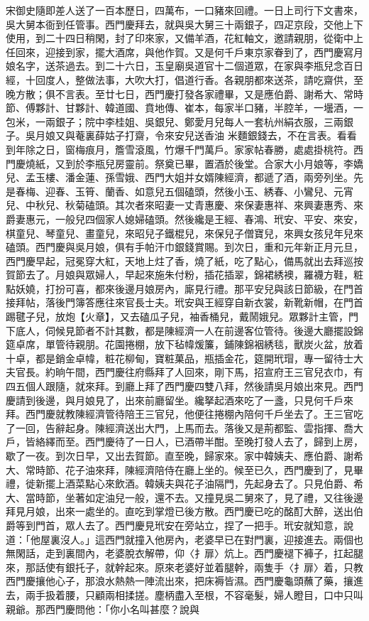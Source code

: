 \begin{showcontents}{}
宋御史隨即差人送了一百本歷日，四萬布，一口豬來回禮。一日上司行下文書來，吳大舅本衙到任管事。西門慶拜去，就與吳大舅三十兩銀子，四疋京段，交他上下使用，到二十四日稍閑，封了印來家，又備羊酒，花紅軸文，邀請親朋，從衛中上任回來，迎接到家，擺大酒席，與他作賀。又是何千戶東京家眷到了，西門慶寫月娘名字，送茶過去。到二十六日，玉皇廟吳道官十二個道眾，在家與李瓶兒念百日經，十回度人，整做法事，大吹大打，倡道行香。各親朋都來送茶，請吃齋供，至晚方散；俱不言表。至廿七日，西門慶打發各家禮畢，又是應伯爵、謝希大、常時節、傅夥計、甘夥計、韓道國、賁地傳、崔本，每家半口豬，半腔羊，一壜酒，一包米，一兩銀子；院中李桂姐、吳銀兒、鄭愛月兒每人一套杭州絹衣服，三兩銀子。吳月娘又與菴裏薛姑子打齋，令來安兒送香油 米麵銀錢去，不在言表。看看到年除之日，窗梅痕月，簷雪滾風，竹爆千門萬戶。家家帖春勝，處處掛桃符。西門慶燒紙，又到於李瓶兒房靈前。祭奠已畢，置酒於後堂。合家大小月娘等，李嬌兒、孟玉樓、潘金蓮、孫雪娥、西門大姐并女婿陳經濟，都遞了酒，兩旁列坐。先是春梅、迎春、玉筲、蘭香、如意兒五個磕頭，然後小玉、綉春、小鸞兒、元宵兒、中秋兒、秋菊磕頭。其次者來昭妻一丈青惠慶、來保妻惠祥、來興妻惠秀、來爵妻惠元，一般兒四個家人媳婦磕頭。然後纔是王經、春鴻、玳安、平安、來安，棋童兒、琴童兒、畫童兒，來昭兒子鐵棍兒，來保兒子僧寶兒，來興女孩兒年兒來磕頭。西門慶與吳月娘，俱有手帕汗巾銀錢賞賜。到次日，重和元年新正月元旦，西門慶早起，冠冕穿大紅，天地上炷了香，燒了紙，吃了點心，備馬就出去拜巡按賀節去了。月娘與眾婦人，早起來施朱付粉，插花插翠，錦裙綉襖，羅襪方鞋，粧點妖嬈，打扮可喜，都來後邊月娘房內，廝見行禮。那平安兒與該日節級，在門首接拜帖，落後門簿答應往來官長士夫。玳安與王經穿自新衣裳，新靴新帽，在門首踢毽子兒，放炮【火章】，又去磕瓜子兒，袖香桶兒，戴鬧娥兒。眾夥計主管，門下底人，伺候見節者不計其數，都是陳經濟一人在前邊客位管待。後邊大廳擺設錦筵卓席，單管待親朋。花園捲棚，放下毡幃煖簾，鋪陳錦裀綉毯，獸炭火盆，放着十卓，都是銷金卓幃，粧花柳甸，寶粧菓品，瓶插金花，筵開玳瑁，專一留待士大夫官長。約晌午間，西門慶往府縣拜了人回來，剛下馬，招宣府王三官兒衣巾，有四五個人跟隨，就來拜。到廳上拜了西門慶四雙八拜，然後請吳月娘出來見。西門慶請到後邊，與月娘見了，出來前廳留坐。纔拏起酒來吃了一盞，只見何千戶來拜。西門慶就教陳經濟管待陪王三官兒，他便往捲棚內陪何千戶坐去了。王三官吃了一回，告辭起身。陳經濟送出大門，上馬而去。落後又是荊都監、雲指揮、喬大戶，皆絡繹而至。西門慶待了一日人，已酒帶半酣。至晚打發人去了，歸到上房，歇了一夜。到次日早，又出去賀節。直至晚，歸家來。家中韓姨夫、應伯爵、謝希大、常時節、花子油來拜，陳經濟陪侍在廳上坐的。候至已久，西門慶到了，見畢禮，徙新擺上酒菜點心來飲酒。韓姨夫與花子油隔門，先起身去了。只見伯爵、希大、當時節，坐著如定油兒一般，還不去。又撞見吳二舅來了，見了禮，又往後邊拜見月娘，出來一處坐的。直吃到掌燈已後方散。西門慶已吃的酩酊大醉，送出伯爵等到門首，眾人去了。西門慶見玳安在旁站立，捏了一把手。玳安就知意，說道：「他屋裏沒人。」這西門就撞入他房內，老婆早已在對門裏，迎接進去。兩個也無閑話，走到裏間內，老婆脫衣解帶，仰〈扌扉〉炕上。西門慶褪下褲子，扛起腿來，那話使有銀托子，就幹起來。原來老婆好並着腿幹，兩隻手〈扌扉〉着，只教西門慶攘他心子，那浪水熱熱一陣流出來，把床褥皆濕。西門慶龜頭蘸了藥，攘進去，兩手扱着腰，只顧兩相揉搓。塵柄盡入至根，不容毫髮，婦人瞪目，口中只叫親爺。那西門慶問他：「你小名叫甚麼？說與
\end{showcontents}
